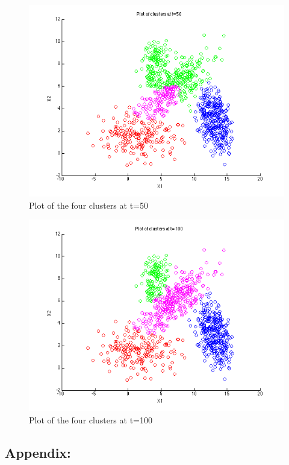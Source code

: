 \documentclass[a4paper]{article}
\begin{document}
\begin{figure}[H]
  \centering
    \includegraphics[scale=.57]{images/clusters_t_50.png}
  \caption{Plot of the four clusters at t=50}
\end{figure}

\begin{figure}[H]
  \centering
    \includegraphics[scale=.57]{images/clusters_t_100.png}
  \caption{Plot of the four clusters at t=100}
\end{figure}

\newpage
\subsection*{Appendix:}
	
	
	
	
\end{document}
